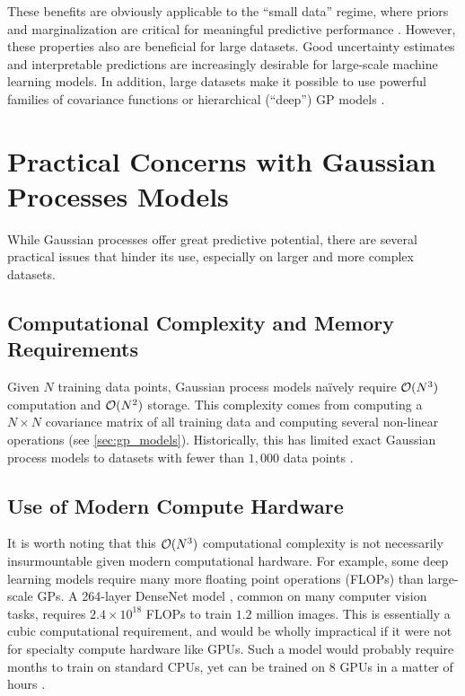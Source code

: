 \noindent
These benefits are obviously applicable to the ``small data'' regime, where priors and marginalization are critical for meaningful predictive performance \cite{rasmussen2001occam}.
However, these properties also are beneficial for large datasets.
Good uncertainty estimates and interpretable predictions are increasingly desirable for large-scale machine learning models.
In addition, large datasets make it possible to use powerful families of covariance functions \citep{wilson2013gaussian,wilson2016deep,benton2019function} or hierarchical (``deep'') GP models \cite{wilson2016deep,salimbeni2017doubly,jankowiak2020deep}.


\section{Practical Concerns with Gaussian Processes Models}

While Gaussian processes offer great predictive potential, there are several practical issues that hinder its use, especially on larger and more complex datasets.

\subsection{Computational Complexity and Memory Requirements}
Given $N$ training data points, Gaussian process models na\"{i}vely require $\bigo{N^3}$ computation and $\bigo{N^2}$ storage.
This complexity comes from computing a $N \times N$ covariance matrix of all training data and computing several non-linear operations (see \cref{sec:gp_models}).
Historically, this has limited exact Gaussian process models to datasets with fewer than $1,\!000$ data points \cite{hensman2013gaussian}.

\subsection{Use of Modern Compute Hardware}
It is worth noting that this $\bigo{N^3}$ computational complexity is not necessarily insurmountable given modern computational hardware.
For example, some deep learning models require many more floating point operations (FLOPs) than large-scale GPs.
A 264-layer DenseNet model \cite{huang2017densely}, common on many computer vision tasks, requires $2.4 \times 10^{18}$ FLOPs to train $1.2$ million images.
This is essentially a cubic computational requirement, and would be wholly impractical if it were not for specialty compute hardware like GPUs.
Such a model would probably require months to train on standard CPUs, yet can be trained on 8 GPUs in a matter of hours \cite{howard2018training}.

